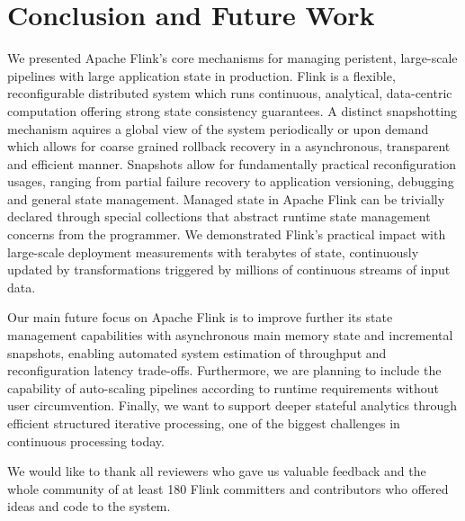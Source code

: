 
\section{Conclusion and Future Work}
\label{sec:conclusion}

We presented Apache Flink's core mechanisms for managing peristent, large-scale pipelines with large application state in production. Flink is a flexible, reconfigurable distributed system which runs continuous, analytical, data-centric computation offering strong state consistency guarantees. A distinct snapshotting mechanism aquires a global view of the system periodically or upon demand which allows for coarse grained rollback recovery in a asynchronous, transparent and efficient manner. Snapshots allow for fundamentally practical reconfiguration usages, ranging from partial failure recovery to application versioning, debugging and general state management. Managed state in Apache Flink can be trivially declared through special collections that abstract runtime state management concerns from the programmer. We demonstrated Flink's practical impact with large-scale deployment measurements with terabytes of state, continuously updated by transformations triggered by millions of continuous streams of input data.

 Our main future focus on Apache Flink is to improve further its state management capabilities with asynchronous main memory state and incremental snapshots, enabling automated system estimation of throughput and reconfiguration latency trade-offs. Furthermore, we are planning to include the capability of auto-scaling pipelines according to runtime requirements without user circumvention. Finally, we want to support deeper stateful analytics through efficient structured iterative processing, one of the biggest challenges in continuous processing today.

 We would like to thank all reviewers who gave us valuable feedback and the whole community of at least 180 Flink committers and contributors who offered ideas and code to the system. 